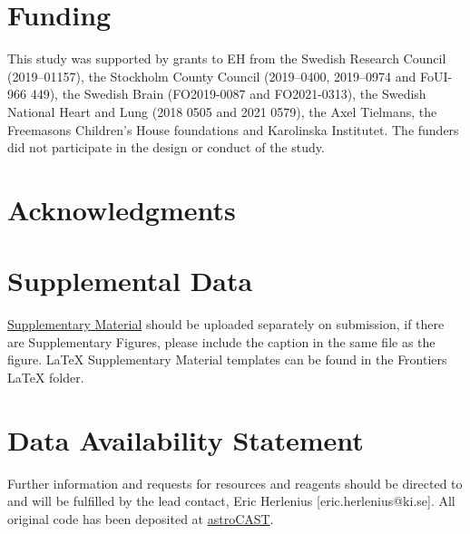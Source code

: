 \documentclass[utf8]{FrontiersinHarvard}
\begin{document}
    \section*{Funding}
    This study was supported by grants to EH from the Swedish Research Council (2019–01157), the Stockholm County Council (2019–0400, 2019–0974 and FoUI-966 449), the Swedish Brain (FO2019-0087 and FO2021-0313), the Swedish National Heart and Lung (2018 0505 and 2021 0579), the Axel Tielmans, the Freemasons Children's House foundations and Karolinska Institutet. The funders did not participate in the design or conduct of the study.


    \section*{Acknowledgments}

    \section*{Supplemental Data}
    \href{http://home.frontiersin.org/about/author-guidelines#SupplementaryMaterial}{Supplementary Material} should
    be uploaded separately on submission, if there are Supplementary Figures, please include the caption in the same
    file as the figure. LaTeX Supplementary Material templates can be found in the Frontiers LaTeX folder.

    \section*{Data Availability Statement}
    Further information and requests for resources and reagents should be directed to and will be fulfilled by the lead contact, Eric Herlenius [eric.herlenius@ki.se]. All original code has been deposited at \href{https://github.com/janreising/astroCAST}{astroCAST}.
\end{document}
